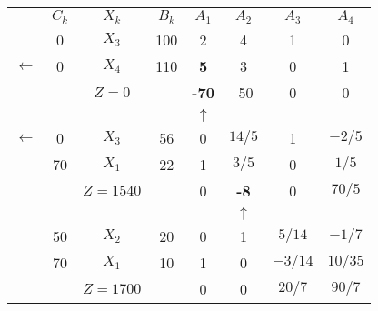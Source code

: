     \begin{tabular}{cccccccc}
\cline{2-8}            & $C_k$   & $X_k$   & $B_k$   & $A_1$   & $A_2$   & $A_3$   & $A_4$ \bigstrut\\
\cline{2-8}            & 0       & $X_3$   & 100     & 2       & 4       & 1       & 0 \bigstrut[t]\\
    $\leftarrow$ & 0       & \textcolor[rgb]{ 1,  0,  0}{\boldmath{}\textbf{$X_4$}\unboldmath{}} & 110     & \textbf{5} & 3       & 0       & 1 \bigstrut[b]\\
\cline{2-8}            &         & $Z=0$   &         & \textcolor[rgb]{ 0,  .439,  .753}{\textbf{-70}} & -50     & 0       & 0 \bigstrut\\
\cline{2-8}            &         &         &         & $\uparrow$ &         &         &  \bigstrut\\
\cline{2-8}    $\leftarrow$ & 0       & \textcolor[rgb]{ 1,  0,  0}{\boldmath{}\textbf{$X_3$}\unboldmath{}} & 56      & 0       & \boldmath{}\textbf{$14/5$}\unboldmath{} & 1       & $-2/5$ \bigstrut[t]\\
            & 70      & $X_1$   & 22      & 1       & $3/5$   & 0       & $1/5$ \bigstrut[b]\\
\cline{2-8}            &         & $Z=1540$ &         & 0       & \textcolor[rgb]{ 0,  .439,  .753}{\textbf{-8}} & 0       & $70/5$ \bigstrut\\
\cline{2-8}            &         &         &         &         & $\uparrow$ &         &  \bigstrut\\
\cline{2-8}            & 50      & $X_2$   & 20      & 0       & 1       & $5/14$  & $-1/7$ \bigstrut[t]\\
            & 70      & $X_1$   & 10      & 1       & 0       & $-3/14$ & $10/35$ \bigstrut[b]\\
\cline{2-8}            &         & $Z=1700$ &         & 0       & 0       & $20/7$  & $90/7$ \bigstrut\\
\cline{2-8}    \end{tabular}%
